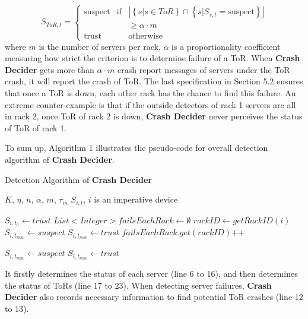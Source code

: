 \documentclass{sig-alternate-05-2015}
\begin{document}
\begin{equation}
S_{ToR,t}=\left\{
    \begin{array}{lcl}
    \text{suspect} & \text{if} & |\left\{s|s\in ToR\right\} \cap \left\{s|S_{s,t}=\text{suspect}\right\}| \\
    && \geq \alpha \cdot m\\
    \text{trust} && \text{otherwise}
    \end{array}
\right.
\end{equation}
where $m$ is the number of servers per rack, $\alpha$ is a  proportionality coefficient measuring how strict the criterion is to determine failure of a ToR. When \textbf{Crash Decider} gets more than $\alpha \cdot m$ crash report messages of servers under the ToR crash, it will report the crash of ToR. The last specification in Section 5.2 ensures that once a ToR is down, each other rack has the chance to find this failure. An extreme counter-example is that if the outside detectors of rack 1 servers are all in rack 2, once ToR of rack 2 is down, \textbf{Crash Decider} never perceives the status of ToR of rack 1.

To sum up, Algorithm 1 illustrates the pseudo-code for overall detection algorithm of \textbf{Crash Decider}.

\renewcommand{\algorithmicrequire}{\textbf{Input:}}
\renewcommand{\algorithmicensure}{\textbf{Output:}}
\begin{algorithm}
	\caption{Detection Algorithm of \textbf{Crash Decider}}
	\begin{algorithmic}[1]
		\REQUIRE $K$, $\eta$, $n$, $\alpha$, $m$, $\tau_m$
		\ENSURE $S_{i,t}$, $i$ is an imperative device
	
            \STATE $S_{i,t_0} \leftarrow trust$
        \ENDFOR
            \STATE $List<Integer> failsEachRack \leftarrow \emptyset$
                \STATE $rackID \leftarrow getRackID(i)$
                    \STATE $S_{i,t_{now}} \leftarrow suspect$
                \ELSE
                    \STATE $S_{i,t_{now}} \leftarrow trust$
                    \STATE $failsEachRack.get(rackID)\text{++}$
                    \ENDIF
                \ENDIF
            \ENDFOR

                    \STATE $S_{i,t_{now}} \leftarrow suspect$
                \ELSE
                    \STATE $S_{i,t_{now}} \leftarrow trust$
                \ENDIF
            \ENDFOR
		\ENDWHILE
	\end{algorithmic}
\end{algorithm}
It firstly determines the status of each server (line 6 to 16), and then determines the status of ToRs (line 17 to 23). When detecting server failures, \textbf{Crash Decider} also records necessary information to find potential ToR crashes (line 12 to 13).
\end{document}
